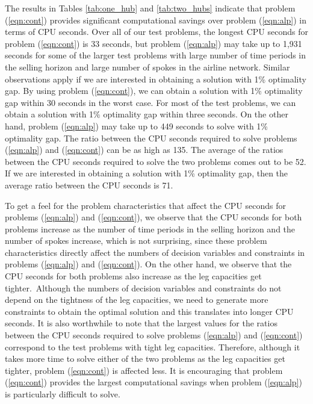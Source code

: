 The results in Tables \ref{tab:one_hub} and \ref{tab:two_hubs} indicate that problem (\ref{eqn:cont}) provides significant computational savings over problem (\ref{eqn:alp}) in terms of CPU seconds. Over all of our test problems, the longest CPU seconds for problem (\ref{eqn:cont}) is 33 seconds, but problem (\ref{eqn:alp}) may take up to 1,931 seconds for some of the larger test problems with large number of time periods in the selling horizon and large number of spokes in the airline network. Similar observations apply if we are interested in obtaining a solution with 1\% optimality gap. By using problem (\ref{eqn:cont}), we can obtain a solution with 1\% optimality gap within 30 seconds in the worst case. For most of the test problems, we can obtain a solution with 1\% optimality gap within three seconds. On the other hand, problem (\ref{eqn:alp}) may take up to 449 seconds to solve with 1\% optimality gap. The ratio between the CPU seconds required to solve problems  (\ref{eqn:alp}) and (\ref{eqn:cont}) can be as high as 135. The average of the ratios between the CPU seconds required to solve the two problems comes out to be 52. If we are interested in obtaining a solution with 1\% optimality gap, then the average ratio between the CPU seconds is 71.


To get a feel for the problem characteristics that affect the CPU seconds for problems (\ref{eqn:alp}) and (\ref{eqn:cont}), we observe that the CPU seconds for both problems increase as the number of time periods in the selling horizon and the number of spokes increase, which is not surprising, since these problem characteristics directly affect the numbers of decision variables and constraints in problems (\ref{eqn:alp}) and (\ref{eqn:cont}). On the other hand, we observe that the CPU seconds for both problems also increase as the leg capacities get tighter.~Although the numbers of decision variables and constraints do not depend on the tightness of the leg capacities,  we need to generate more constraints to obtain the optimal solution and this translates into longer CPU seconds. It is also worthwhile to note that the largest values for the ratios between the CPU seconds required to solve problems (\ref{eqn:alp}) and (\ref{eqn:cont}) correspond to the test problems with tight leg capacities. Therefore, although it takes more time to solve either of the two problems as the leg capacities get tighter, problem (\ref{eqn:cont}) is affected less. It is encouraging that problem (\ref{eqn:cont}) provides the largest computational savings when problem (\ref{eqn:alp}) is particularly difficult to solve.


